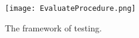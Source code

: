 

\begin{figure}[h]
	\graphicspath{{pic/}}
	\begin{center}
		\texttt{[image: EvaluateProcedure.png]}
	\end{center}
	\caption{ The framework of testing. }
	\label{EvaluateProcedure}
\end{figure}

\clearpage
